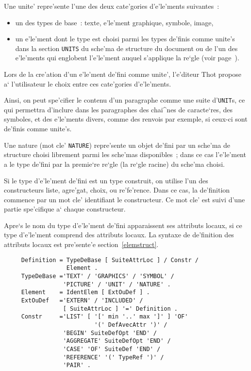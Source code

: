 {Une unite' repre'sente l'une des deux cate'gories d'e'le'ments suivantes~:
\begin{itemize}
\item
un des types de base~: texte, e'le'ment graphique, symbole, image,
\item
un e'le'ment dont le type est choisi parmi les types de'finis comme unite's
dans la section {\tt UNITS} du sche'ma de structure du document
ou de l'un des e'le'ments qui englobent l'e'le'ment auquel s'applique la
re`gle (voir page~\pageref{uniteslog}).
\end{itemize}

Lors de la cre'ation d'un e'le'ment de'fini comme unite',
l'e'diteur Thot propose a` l'utilisateur le choix entre ces cate'gories
d'e'le'ments.

Ainsi, on peut spe'cifier le contenu d'un paragraphe comme une suite
d'{\tt UNIT}s, ce qui permettra d'inclure dans les paragraphes des chai^nes
de caracte`res, des symboles, et des e'le'ments divers, comme des renvois
par exemple, si ceux-ci sont de'finis comme unite's.

Une nature (mot cle' {\tt NATURE}) repre'sente un objet de'fini par un
sche'ma de structure choisi librement parmi les sche'mas disponibles~;
dans ce cas l'e'le'ment a le type de'fini par la premie`re re`gle
(la re`gle racine) du sche'ma choisi.

Si le type d'e'le'ment de'fini est un type construit, on utilise l'un des
constructeurs liste, agre'gat, choix, ou re'fe'rence. Dans ce cas,
la de'finition commence par un mot cle' identifiant le constructeur.
Ce mot cle' est suivi d'une partie spe'cifique a` chaque constructeur.

Apre`s le nom du type d'e'le'ment de'fini apparaissent ses attributs locaux,
si ce type d'e'le'ment comprend des attributs locaux. La syntaxe de
de'finition des attributs locaux est pre'sente'e section~\ref{elemstruct}.

\begin{verbatim}
     Definition = TypeDeBase [ SuiteAttrLoc ] / Constr /
                  Element .
     TypeDeBase ='TEXT' / 'GRAPHICS' / 'SYMBOL' /
                 'PICTURE' / 'UNIT' / 'NATURE' .
     Element    = IdentElem [ ExtOuDef ] .
     ExtOuDef   ='EXTERN' / 'INCLUDED' / 
                 [ SuiteAttrLoc ] '=' Definition .
     Constr     ='LIST' [ '[' min '..' max ']' ] 'OF'
                          '(' DefAvecAttr ')' /
                 'BEGIN' SuiteDefOpt 'END' /
                 'AGGREGATE' SuiteDefOpt 'END' /
                 'CASE' 'OF' SuiteDef 'END' /
                 'REFERENCE' '(' TypeRef ')' /
                 'PAIR' .
\end{verbatim}

}
